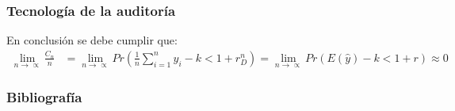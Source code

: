 \documentclass[10pt, xcolor=table, x11names]{beamer}
\begin{document}
\begin{frame}
    \frametitle{{\normalsize Tecnología de la auditoría} {}}
    En conclusión se debe cumplir que:
    \begin{align}
    \lim_{n\rightarrow\propto}\frac{C_{n}}{n}&=\lim_{n\rightarrow\propto}Pr(\frac{1}{n}\sum_{i=1}^{n}\hat{y}_{i}-k<1+r_{D}^{n})=\lim_{n\rightarrow\propto}Pr(E(\hat{y})-k<1+r)\approx 0
    \end{align}
\end{frame}


\begin{frame}[allowframebreaks]
    \frametitle{{\large 
            Bibliografía}}
    \renewcommand{\refname}{Referencias}
    
    
\end{frame}
\end{document}
